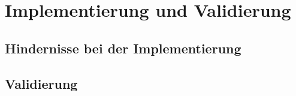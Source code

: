 \chapter{Implementierung und Validierung}

\section{Hindernisse bei der Implementierung}

\section{Validierung}
